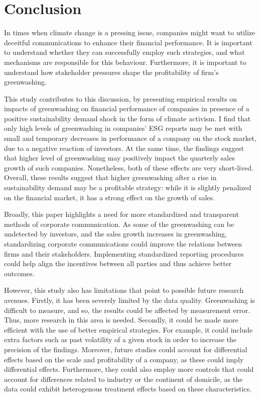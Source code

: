 \documentclass[12pt]{article}
\begin{document}
\newpage
\section{Conclusion}\label{sect:discussion}


In times when climate change is a pressing issue, companies might want to utilize deceitful communications to enhance their financial performance. It is important to understand whether they can successfully employ such strategies, and what mechanisms are responsible for this behaviour. Furthermore, it is important to understand how stakeholder pressures shape the profitability of firm's greenwashing.

This study contributes to this discussion, by presenting empirical results on impacts of greenwashing on financial performance of companies in presence of a positive sustainability demand shock in the form of climate activism. I find that only high levels of greenwashing in companies' ESG reports may be met with small and temporary decreases in performance of a company on the stock market, due to a negative reaction of investors. At the same time, the findings suggest that higher level of greenwashing may positively impact the quarterly sales growth of such companies. Nonetheless, both of these effects are very short-lived. Overall, these results suggest that higher greenwashing after a rise in sustainability demand may be a profitable strategy: while it is slightly penalized on the financial market, it has a strong effect on the growth of sales.

Broadly, this paper highlights a need for more standardized and transparent methods of corporate communication. As some of the greenwashing can be undetected by investors, and the sales growth increases in greenwashing, standardizing corporate communications could improve the relations between firms and their stakeholders. Implementing standardized reporting procedures could help align the incentives between all parties and thus achieve better outcomes. 

However, this study also has limitations that point to possible future research avenues. Firstly, it has been severely limited by the data quality. Greenwashing is difficult to measure, and so, the results could be affected by measurement error. Thus, more research in this area is needed. Secondly, it could be made more efficient with the use of better empirical strategies. For example, it could include extra factors such as past volatility of a given stock in order to increase the precision of the findings. Moreover, future studies could account for differential effects based on the scale and profitability of a company, as these could imply differential effects. Furthermore, they could also employ more controls that could account for differences related to industry or the continent of domicile, as the data could exhibit heterogenous treatment effects based on these characteristics.  
\end{document}
